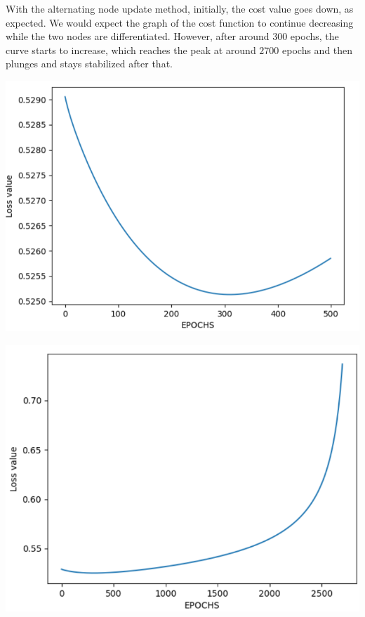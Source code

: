 \documentclass[12pt,english,]{article}
\let\origfigure\figure
\let\endorigfigure\endfigure
\renewenvironment{figure}[1][2] {
    \expandafter\origfigure\expandafter[H]
} {
    \endorigfigure
}
\begin{document}
With the alternating node update method, initially, the cost value goes down, as expected. We would expect the graph of the cost function to continue decreasing while the two nodes are differentiated. However, after around 300 epochs, the curve starts to increase, which reaches the peak at around $2700$ epochs and then plunges and stays stabilized after that. 


\begin{figure}

{\centering \includegraphics[width=0.7\linewidth]{images/500_graph} 

}
\caption{\label{fig5:figs}The graph of cost function after $500$ epochs trained with alternating node update method.}\label{fig:unnamed-chunk-4}
\end{figure}

\begin{figure}

{\centering \includegraphics[width=0.7\linewidth]{images/2k7_graph} 

}
\caption{\label{fig5:figs}The graph of cost function after $2700$ epochs trained with alternating node update method.}\label{fig:unnamed-chunk-5}
\end{figure}
\end{document}
